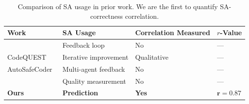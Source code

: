 \begin{table}[t]
\centering
\caption{Comparison of SA usage in prior work. We are the first to quantify SA-correctness correlation.}
\label{tab:related}
\begin{tabular}{@{}llll@{}}
\toprule
Work & SA Usage & Correlation Measured & $r$-Value \\
\midrule
\citet{Blyth2025Static} & Feedback loop & No & --- \\
CodeQUEST~\citep{Liu2025CodeQUEST} & Iterative improvement & Qualitative & --- \\
AutoSafeCoder~\citep{Nunez2024AutoSafeCoder} & Multi-agent feedback & No & --- \\
\citet{Yetistiren2023Evaluating} & Quality measurement & No & --- \\
\textbf{Ours} & \textbf{Prediction} & \textbf{Yes} & $\mathbf{r=0.87}$ \\
\bottomrule
\end{tabular}
\end{table}
